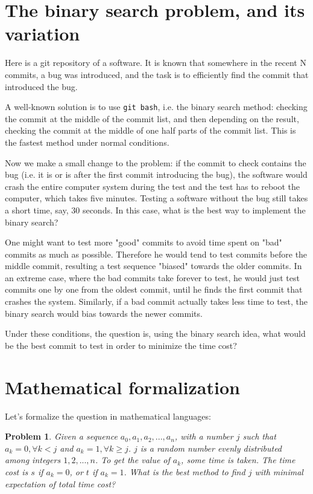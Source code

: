 \documentclass[]{article}
\begin{document}
\newtheorem{problem}{Problem}
\newtheorem{lemma}{Property}

\section{The binary search problem, and its variation}

Here is a git repository of a software. It is known that somewhere in the recent N commits, a bug was introduced, and the task is to efficiently find the commit that introduced the bug.

A well-known solution is to use \texttt{git bash}, i.e. the binary search method: checking the commit at the middle of the commit list, and then depending on the result, checking the commit at the middle of one half parts of the commit list. This is the fastest method under normal conditions.

Now we make a small change to the problem: if the commit to check contains the bug (i.e. it is or is after the first commit introducing the bug), the software would crash the entire computer system during the test and the test has to reboot the computer, which takes five minutes. Testing a software without the bug still takes a short time, say, 30 seconds. In this case, what is the best way to implement the binary search?

One might want to test more "good" commits to avoid time spent on "bad" commits as much as possible. Therefore he would tend to test commits before the middle commit, resulting a test sequence "biased" towards the older commits. In an extreme case, where the bad commits take forever to test, he would just test commits one by one from the oldest commit, until he finds the first commit that crashes the system. Similarly, if a bad commit actually takes less time to test, the binary search would bias towards the newer commits.

Under these conditions, the question is, using the binary search idea, what would be the best commit to test in order to minimize the time cost?

\section{Mathematical formalization}

Let's formalize the question in mathematical languages:

\begin{problem}
	Given a sequence $a_0, a_1, a_2, ..., a_n$, with a number $j$ such that $a_k = 0, \forall k < j$ and $a_k = 1, \forall k \ge j$. $j$ is a random number evenly distributed among integers $1, 2, ..., n$. To get the value of $a_k$, some time is taken. The time cost is $s$ if $a_k = 0$, or $t$ if $a_k = 1$. What is the best method to find $j$ with minimal expectation of total time cost?
\end{problem}
\end{document}
